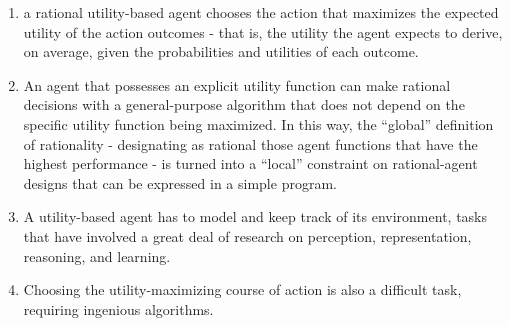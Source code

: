 \begin{enumerate}
    \item a rational utility-based agent chooses the action that maximizes the expected utility of the action outcomes - that is, the utility the agent expects to derive, on average, given the probabilities and utilities of each outcome.
    \hfill \cite{ai/book/Artificial-Intelligence-A-Modern-Approach/Russell-Norvig}

    \item An agent that possesses an explicit utility function can make rational decisions with a general-purpose algorithm that does not depend on the specific utility function being maximized. In this way, the “global” definition of rationality - designating as rational those agent functions that have the highest performance - is turned into a “local” constraint on rational-agent designs that can be expressed in a simple program.
    \hfill \cite{ai/book/Artificial-Intelligence-A-Modern-Approach/Russell-Norvig}

    \item A utility-based agent has to model and keep track of its environment, tasks that have involved a great deal of research on perception, representation, reasoning, and learning.
    \hfill \cite{ai/book/Artificial-Intelligence-A-Modern-Approach/Russell-Norvig}

    \item Choosing the utility-maximizing course of action is also a difficult task, requiring ingenious algorithms.
    \hfill \cite{ai/book/Artificial-Intelligence-A-Modern-Approach/Russell-Norvig}
\end{enumerate}



\vspace{0.5cm}


